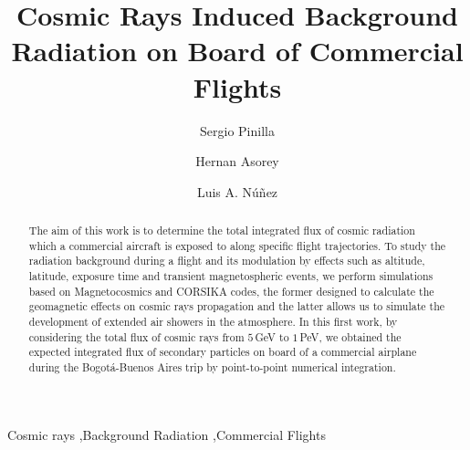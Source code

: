 \documentclass[3p,times,twocolumn]{elsarticle}
\begin{document}
\begin{frontmatter}



\dochead{}

\title{Cosmic Rays Induced Background Radiation on Board of Commercial Flights}


\author[UIS]{Sergio Pinilla}
\author[UIS,CAB]{Hernan Asorey}
\author[UIS]{Luis A. N\'u\~nez}

\address[UIS]{Escuela de F\'isica, Universidad Industrial de Santander,
Bucaramanga, Colombia}
\address[CAB]{Laboratorio de Detecci\'on de Part\'iculas y Radiaci\'on, Centro At\'omico Bariloche \& Instituto Balseiro,
San Carlos and Bariloche, Argentina}

\begin{abstract}
	The aim of this work is to determine the total integrated flux of cosmic
radiation which a commercial aircraft is exposed to along specific flight
trajectories. To study the radiation background during a flight and its
modulation by effects such as altitude, latitude, exposure time and transient
magnetospheric events, we perform simulations based on Magnetocosmics
and CORSIKA codes, the former designed to calculate the geomagnetic
effects on cosmic rays propagation and the latter allows us to simulate the
development of extended air showers in the atmosphere. In this first work, by
considering the total flux of cosmic rays from $5$\,GeV to $1$\,PeV, we
obtained the expected integrated flux of secondary particles on board of a
commercial airplane during the Bogot\'a-Buenos Aires trip by point-to-point
numerical integration.
\end{abstract}

\begin{keyword}
Cosmic rays \sep Background Radiation \sep Commercial Flights

\end{keyword}

\end{frontmatter}
\end{document}

